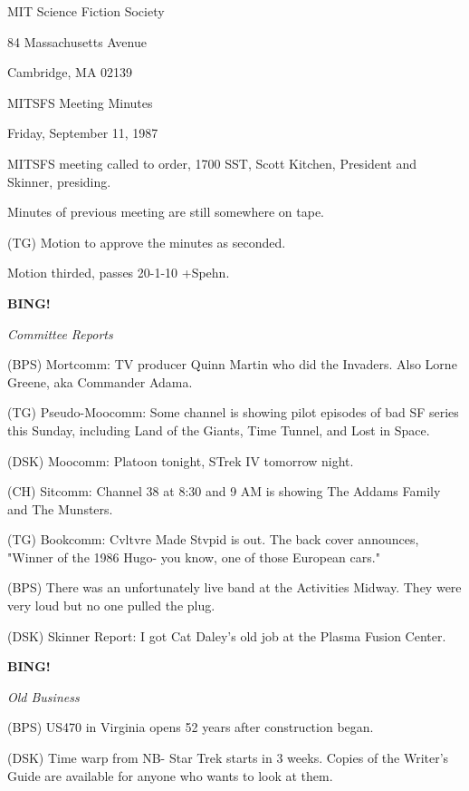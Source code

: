 \documentclass[12pt]{article}
\newcommand{\bing}{{\bf BING!} }
\newcommand{\goto}[1]{\bing \vskip 12pt \centerline{{\em{#1}}}}
\begin{document}
\begin{center}

MIT Science Fiction Society 

84 Massachusetts Avenue

Cambridge, MA 02139

\vspace{12pt}

MITSFS Meeting Minutes 

Friday, September 11, 1987

\end{center}
 
\vspace{18pt}

\setlength{\parskip}{6pt}

\noindent
MITSFS meeting called to order, 1700 SST,
Scott Kitchen, President and Skinner, presiding.

Minutes of previous meeting are still somewhere on tape.

(TG) Motion to approve the minutes as seconded.

Motion thirded, passes 20-1-10 +Spehn.

\goto{Committee Reports}

(BPS) Mortcomm: TV producer Quinn Martin who did the Invaders. Also Lorne Greene, aka Commander Adama.

(TG) Pseudo-Moocomm: Some channel is showing pilot episodes of bad SF series this Sunday, including Land of the Giants, Time Tunnel, and Lost in Space.

(DSK) Moocomm: Platoon tonight, STrek IV tomorrow night.

(CH) Sitcomm: Channel 38 at 8:30 and 9 AM is showing The Addams Family and The Munsters.

(TG) Bookcomm: Cvltvre Made Stvpid is out. The back cover announces, "Winner of the 1986 Hugo- you know, one of those European cars."

(BPS) There was an unfortunately live band at the Activities Midway. They were very loud but no one pulled the plug.

(DSK) Skinner Report: I got Cat Daley's old job at the Plasma Fusion Center.

\goto{Old Business}

(BPS) US470 in Virginia opens 52 years after construction began.

(DSK) Time warp from NB- Star Trek starts in 3 weeks. Copies of the Writer's Guide are available for anyone who wants to look at them.
\end{document}
